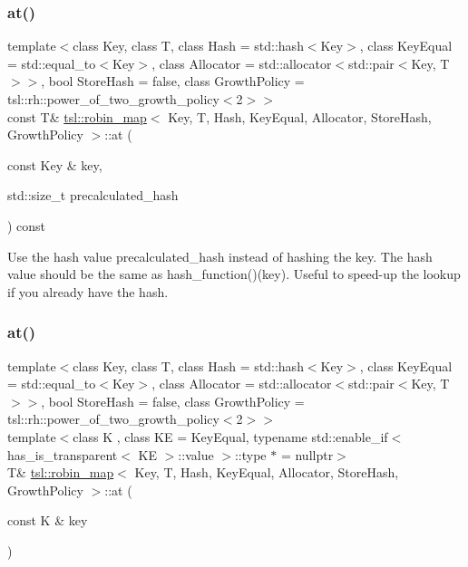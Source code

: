 \subsubsection{\texorpdfstring{at()}{at()}\hspace{0.1cm}{\footnotesize\ttfamily [2/6]}}
{\footnotesize\ttfamily template$<$class Key, class T, class Hash = std\+::hash$<$\+Key$>$, class Key\+Equal = std\+::equal\+\_\+to$<$\+Key$>$, class Allocator = std\+::allocator$<$std\+::pair$<$\+Key, T$>$$>$, bool Store\+Hash = false, class Growth\+Policy = tsl\+::rh\+::power\+\_\+of\+\_\+two\+\_\+growth\+\_\+policy$<$2$>$$>$ \\
const T\& \mbox{\hyperlink{classtsl_1_1robin__map}{tsl\+::robin\+\_\+map}}$<$ Key, T, Hash, Key\+Equal, Allocator, Store\+Hash, Growth\+Policy $>$\+::at (\begin{DoxyParamCaption}\item[{const Key \&}]{key,  }\item[{std\+::size\+\_\+t}]{precalculated\+\_\+hash }\end{DoxyParamCaption}) const\hspace{0.3cm}{\ttfamily [inline]}}





Use the hash value \textquotesingle{}precalculated\+\_\+hash\textquotesingle{} instead of hashing the key. The hash value should be the same as hash\+\_\+function()(key). Useful to speed-\/up the lookup if you already have the hash. \mbox{\label{classtsl_1_1robin__map_aad9799a35580d252f365a415e769341a}} 
\subsubsection{\texorpdfstring{at()}{at()}\hspace{0.1cm}{\footnotesize\ttfamily [3/6]}}
{\footnotesize\ttfamily template$<$class Key, class T, class Hash = std\+::hash$<$\+Key$>$, class Key\+Equal = std\+::equal\+\_\+to$<$\+Key$>$, class Allocator = std\+::allocator$<$std\+::pair$<$\+Key, T$>$$>$, bool Store\+Hash = false, class Growth\+Policy = tsl\+::rh\+::power\+\_\+of\+\_\+two\+\_\+growth\+\_\+policy$<$2$>$$>$ \\
template$<$class K , class KE  = Key\+Equal, typename std\+::enable\+\_\+if$<$ has\+\_\+is\+\_\+transparent$<$ K\+E $>$\+::value $>$\+::type $\ast$  = nullptr$>$ \\
T\& \mbox{\hyperlink{classtsl_1_1robin__map}{tsl\+::robin\+\_\+map}}$<$ Key, T, Hash, Key\+Equal, Allocator, Store\+Hash, Growth\+Policy $>$\+::at (\begin{DoxyParamCaption}\item[{const K \&}]{key }\end{DoxyParamCaption})\hspace{0.3cm}{\ttfamily [inline]}}

